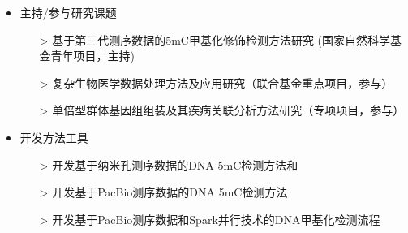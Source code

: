 \documentclass[zh]{resume}
\begin{document}
\begin{itemize}
  \item 主持/参与研究课题
  \begin{itemize}
    \item[>] 基于第三代测序数据的5mC甲基化修饰检测方法研究 (国家自然科学基金青年项目，主持)
    \item[>] 复杂生物医学数据处理方法及应用研究（联合基金重点项目，参与）
    \item[>] 单倍型群体基因组组装及其疾病关联分析方法研究（专项项目，参与）
  \end{itemize}
  \item 开发方法工具
  \begin{itemize}
    \item[>] 开发基于纳米孔测序数据的DNA 5mC检测方法和
    \item[>] 开发基于PacBio测序数据的DNA 5mC检测方法
    \item[>] 开发基于PacBio测序数据和Spark并行技术的DNA甲基化检测流程
  \end{itemize}
\end{itemize}
\end{document}
